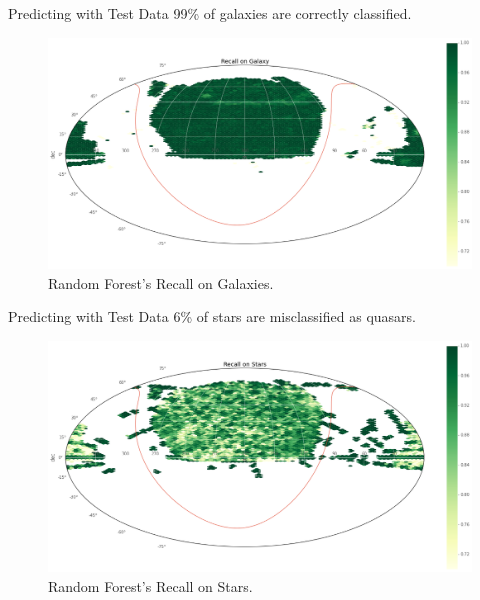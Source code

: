 \documentclass{beamer}
\begin{document}
\begin{frame}{Predicting with Test Data}
99\% of galaxies are correctly classified.
	\begin{figure}
		\centering
		\includegraphics[width=\textwidth]{images/recall_galaxies}
		\caption{Random Forest's Recall on Galaxies.}
	\end{figure}
\end{frame}


\begin{frame}{Predicting with Test Data}
	6\% of stars are misclassified as quasars.
	\begin{figure}
		\centering
		\includegraphics[width=\textwidth]{images/recall_stars}
		\caption{Random Forest's Recall on Stars.}
	\end{figure}
\end{frame}
\end{document}

